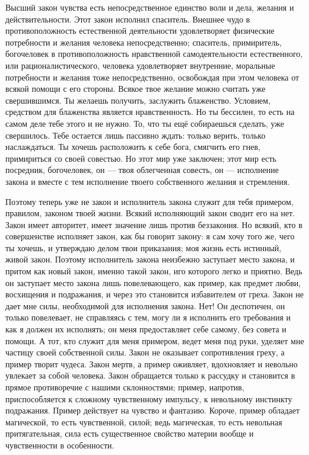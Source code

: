 \documentclass[12pt,oneside]{book}
\begin{document}
Высший закон чувства есть непосредственное единство воли и дела, желания и действительности. Этот закон исполнил спаситель. Внешнее чудо в противоположность естественной деятельности удовлетворяет физические потребности и желания человека непосредственно; спаситель, примиритель, богочеловек в противоположность нравственной самодеятельности естественного, или рационалистического, человека удовлетворяет внутренние, моральные потребности и желания тоже непосредственно, освобождая при этом человека от всякой помощи с его стороны. Всякое твое желание можно считать уже свершившимся. Ты желаешь получить, заслужить блаженство. Условием, средством для блаженства является нравственность. Но ты бессилен, то есть на самом деле тебе этого и не нужно. То, что ты ещё собираешься сделать, уже свершилось. Тебе остается лишь пассивно ждать: только верить, только наслаждаться. Ты хочешь расположить к себе бога, смягчить его гнев, примириться со своей совестью. Но этот мир уже заключен; этот мир есть посредник, богочеловек, он --- твоя облегченная совесть, он --- исполнение закона и вместе с тем исполнение твоего собственного желания и стремления.

Поэтому теперь уже не закон и исполнитель закона служит для тебя примером, правилом, законом твоей жизни. Всякий исполняющий закон сводит его на нет. Закон имеет авторитет, имеет значение лишь против беззакония. Но всякий, кто в совершенстве исполняет закон, как бы говорит закону: я сам хочу того же, чего ты хочешь, и утверждаю делом твои приказания; моя жизнь есть истинный, живой закон. Поэтому исполнитель закона неизбежно заступает место закона, и притом как новый закон, именно такой закон, иго которого легко и приятно. Ведь он заступает место закона лишь повелевающего, как пример, как предмет любви, восхищения и подражания, и через это становится избавителем от греха. Закон не дает мне силы, необходимой для исполнения закона. Нет! Он деспотичен, он только повелевает, не справляясь с тем, могу ли я исполнить его требования и как я должен их исполнять; он меня предоставляет себе самому, без совета и помощи. А тот, кто служит для меня примером, ведет меня под руки, уделяет мне частицу своей собственной силы. Закон не оказывает сопротивления греху, а пример творит чудеса. Закон мертв, а пример оживляет, вдохновляет и невольно увлекает за собой человека. Закон обращается только к рассудку и становится в прямое противоречие с нашими склонностями; пример, напротив, приспособляется к сложному чувственному импульсу, к невольному инстинкту подражания. Пример действует на чувство и фантазию. Короче, пример обладает магической, то есть чувственной, силой; ведь магическая, то есть невольная притягательная, сила есть существенное свойство материи вообще и чувственности в особенности.
\end{document}

